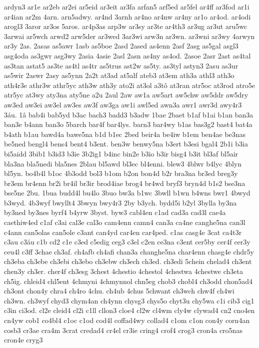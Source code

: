 {ardyn3
ar1e
ar2eb
ar2ei
ar5eid
ar3eit
ar3fa
arfan5
arf5ed
ar5fel
ar4ff
ar3fod
ar1i
ar4ian
ar2m
4arn.
arn5adwy.
ar4nd
3arnh
ar4no
ar4nw
ar4ny
ar1o
ar4od.
ar4odi
arogl3
3aror
ar3os
5aros.
ar4p3as
arp3w
ar3sy
ar3te
ar4th3
ar3ug
ar3ut
aru5wc
3arwai
ar5wch
arwd2
arw5der
ar3wed
3ar3wi
arw3n
ar3wn.
ar3wni
ar3wy
4arwyn
ar3y
2as.
2asas
as5awr
1asb
as5boe
2asd
2ased
as4enn
2asf
2asg
as5gal
asgl3
asg4oda
as3gwr
asg3wy
2asia
4asie
2asl
2asn
as4ny
as4od.
2asoe
2asr
2ast
as4tal
as3tan
astat5
as3te
as4tl
as4tr
as5trus
ast2w
as5ty.
as3tyl
astyn3
2asu
as3ur
as5wir
2aswr
2asy
as5ynn
2a2t
at3ad
at5alf
ateb3
at3em
ath3a
athl3
ath3o
ath4r3e
athr3w
athr5yc
ath3w
ath3y
ato2i
at3ol
a3tô
at3ran
atr5oc
at3rod
atro5e
atr5yc
at3wy
aty3na
aty5ne
a2u
2aul
2aw
aw1a
aw5art
aw5chw
aw5ddr
aw5dry
aw3ed
aw3ei
aw3el
aw3es
aw3f
aw3ga
aw1i
awl5ed
awn3a
awr1
awr3d
awy4r3
3áu.
1â
bab4i
bab5yd
b3ac
bach3
badd3
b3adw
1bae
2baet
b1af
b1ai
b1an
ban3a
ban3e
b4ann
ban3o
5barch
bar4f
bar4lys.
barn3
bar4wy
b1as
bas3g2
bast4
bat4a
b4ath
b1au
bawd4a
bawe5na
b1d
b1ec
2bed
beir4a
be4iw
b1em
ben4ae
be3nas
be5ned
bengl4
bens4
bent4
b3ent.
ben3w
benwy5na
b3ert
b3esi
bgal4
2b1i
b3ia
bi5aidd
3bib1
b3id3
b3ie
3b2ig1
b4inc
bin2e
b3io
b3ir
bisg4
b3it
bl3af
bl5air
bla3na
bla5nedi
bla5nes
2blau
bl5awd
bl3ec
bl4enni.
blew3
4blwr
b4lyc
4blyn
bl5yn.
bo4b4l
b1oc
4b3odd
bol3
b1om
b2on
bon4d
b2r
bra3na
br3ed
breg3y
br3em
br4enn
br2i
br4il
br3ir
brod4iae
brog4
br4wd
bryf3
bryn4d
b1s2
bse3na
bse5ne
2bu.
1bua
budd4l
bu4lo
3buo
bw3a
b1wc
3bwll
b1wn
b4wns
bwr1
4bwyd
b3wyd.
4b3wyf
bwyllt4
3bwyn
bwy4r3
2by
b3ych.
bydd5i
b2yl
3bylla
by3na
by3ned
by3nes
byrf4
b4yrw
3byst.
byw3
cabl4en
c1ad
cad3a
cad3l
cae4a
caethiw4ed
c1af
c3ai
cal3e
cal3o
cam4enn
camn4
can3a
ca4ne
canghe5na
can3l
c4ann
can5olas
can5ole
c3ant
can4yd
car4en
car4ped.
c1as
casg4e
3cat
ca4t3r
c3au
c3áu
c1b
cd2
c1e
c3ed
c5edig
ceg3
c3el
c2en
ce3na
c3ent
cer5by
cer4f
cer3y
ceu4l
c3ff
3chae
ch3af.
ch4afb
ch4afi
chan3a
changhe5na
char4enn
chasg4e
chdr5y
ch3eba
ch3ebe
ch3ebi
ch3ebo
ch3ebw
ch3ech
ch3ed.
ch3edi
5chein
chelad4
ch3ent
chen3y
ch3er.
cher4f
ch3esg
3chest
4chestio
4chestol
4chestwa
4chestwe
ch3eta
ch5ig.
chleid4
chl5ent
4chmyni
4chmynnol
chn5eg
chob3
chobl4
ch3odd
chon5ad4
ch3ont
chon4y
chra4
ch4ro
4chu.
ch4ub
4chus
5chwant
ch3wch
chw4f
ch4wi
ch3wn.
ch3wyf
chyd3
chym4an
ch4ynn
chysg3
chys5o
chyt3u
chy5wa
c1i
cib3
cig1
c3in
ci3od.
cl2e
cleid4
cl2i
c1ll
cllon3
cloe4
cl2w
cl4wm
cly4w
clywad4
cn2
cno4en
cn4yw
cob1
co4bl4
c1oc
c1od
cod4l
coffad4wy
collad4
c1om
c1on
con4y
corn4an
cosb3
cr3ae
cra4m
3crat
credad4
cr4el
cr3ie
cring4
crof4
crog3
cron4a
cro5nas
cron4e
cryg3
}
